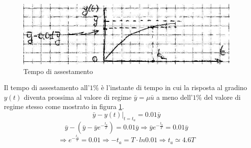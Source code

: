 \documentclass[a4paper]{report}
\begin{document}
\begin{figure}[!h]
  \begin{center}
    \includegraphics[scale=0.5]{./figures/modelliStrutturali04.png}
    \caption{Tempo di assestamento}
    \label{fig:modelliStrutturali04}
  \end{center}
\end{figure}
Il tempo di assestamento all'$1\%$ \`e l'instante di tempo in cui la
risposta al gradino $y(t)$ diventa prossima al valore di regime
$\bar{y} = \mu \bar{u}$ a meno dell'$1\%$ del valore di regime stesso
come mostrato in figura \ref{fig:modelliStrutturali04}.
\[
\left . \bar{y} - y(t) \right |_{t = t_a} = 0.01\bar{y}
\]
\[
\bar{y} - (\bar{y} - \bar{y} e^{-\frac{t_a}{T}}) = 0.01\bar{y}
\Rightarrow \bar{y} e^{-\frac{t_a}{T}} = 0.01\bar{y}
\]
\[
\Rightarrow e^{-\frac{t_a}{T}} = 0.01 \Rightarrow  - t_a = T \cdot ln
0.01 \Rightarrow t_a \simeq 4.6 T
\]
\end{document}
